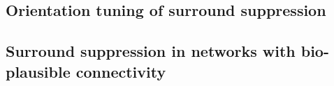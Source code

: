 \documentclass[10pt,conference,compsocconf,a4paper]{IEEEtran}
\begin{document}
	\subsection{Orientation tuning of surround suppression}
	\label{sec22}

	\subsection{Surround suppression in networks with bio-plausible connectivity}
	\label{sec23}



\newpage




\end{document}
